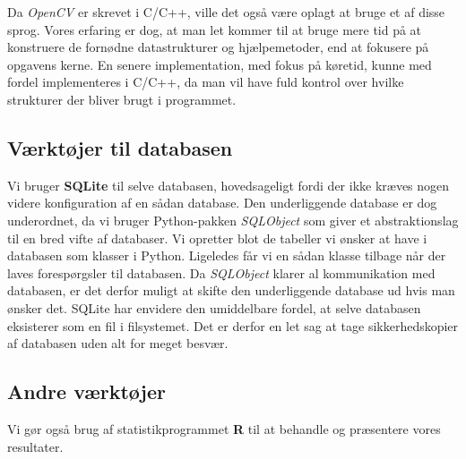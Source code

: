 {Da \emph{OpenCV} er skrevet i C/C++, ville det også være oplagt at bruge
et af disse sprog. Vores erfaring er dog, at man let kommer til at bruge
mere tid på at konstruere de fornødne datastrukturer og hjælpemetoder,
end at fokusere på opgavens kerne. En senere implementation, med fokus
på køretid, kunne med fordel implementeres i C/C++, da man vil have fuld
kontrol over hvilke strukturer der bliver brugt i programmet.

\subsection{Værktøjer til databasen}
Vi bruger \textbf{SQLite} til selve databasen, hovedsageligt fordi der ikke
kræves nogen videre konfiguration af en sådan database. Den
underliggende database er dog underordnet, da vi bruger Python-pakken
\emph{SQLObject} som giver et abstraktionslag til en bred vifte af
databaser. Vi opretter blot de tabeller vi ønsker at have i databasen
som klasser i Python. Ligeledes får vi en sådan klasse tilbage når der
laves forespørgsler til databasen. Da \emph{SQLObject} klarer al
kommunikation med databasen, er det derfor muligt at skifte den
underliggende database ud hvis man ønsker det. SQLite har envidere den
umiddelbare fordel, at selve databasen eksisterer som en fil i
filsystemet.  Det er derfor en let sag at tage sikkerhedskopier af
databasen uden alt for meget besvær.

\subsection{Andre værktøjer}
Vi gør også brug af statistikprogrammet \textbf{R} til at behandle og
præsentere vores resultater.

}

